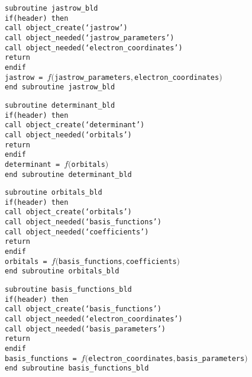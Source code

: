 \documentclass[a4paper,11pt]{article}
\begin{document}
\vspace{0.5cm}
\noindent
{\tt subroutine jastrow_bld\\
if(header) then\\
\phantom{xx} call object_create(`jastrow')\\
\phantom{xx} call object_needed(`jastrow_parameters')\\
\phantom{xx} call object_needed(`electron_coordinates')\\
\phantom{xx} return\\
endif\\
jastrow  = $f(${\tt jastrow_parameters}$,${\tt electron_coordinates}$)$\\
end subroutine jastrow_bld}

\vspace{0.5cm}
\noindent
{\tt subroutine determinant_bld\\
if(header) then\\
\phantom{xx} call object_create(`determinant')\\
\phantom{xx} call object_needed(`orbitals')\\
\phantom{xx} return\\
endif\\
determinant  = $f(${\tt orbitals}$)$\\
end subroutine determinant_bld}

\vspace{0.5cm}
\noindent
{\tt subroutine orbitals_bld\\
if(header) then\\
\phantom{xx} call object_create(`orbitals')\\
\phantom{xx} call object_needed(`basis_functions')\\
\phantom{xx} call object_needed(`coefficients')\\
\phantom{xx} return\\
endif\\
orbitals  = $f(${\tt basis_functions}$,${\tt coefficients}$)$\\
end subroutine orbitals_bld}

\vspace{0.5cm}
\noindent
{\tt subroutine basis_functions_bld\\
if(header) then\\
\phantom{xx} call object_create(`basis_functions')\\
\phantom{xx} call object_needed(`electron_coordinates')\\
\phantom{xx} call object_needed(`basis_parameters')\\
\phantom{xx} return\\
endif\\
basis_functions  = $f(${\tt electron_coordinates}$,${\tt basis_parameters}$)$\\
end subroutine basis_functions_bld}
\end{document}
